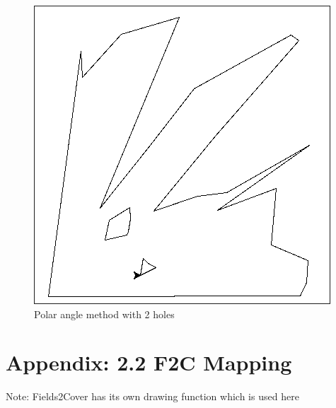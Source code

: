 \documentclass[progress]{cmpreport}
\begin{document}
\begin{appendix}
\begin{figure}[H]
		\begin{minipage}[b]{0.45\textwidth}
			\centering
			\includegraphics[width=\textwidth]{images/FirstMappingLargeHoles.jpg}
			\caption{Polar angle method with 2 holes}
		\end{minipage}
		\hfill

	\end{figure}

	\section{Appendix: 2.2 F2C Mapping}
	\label{F2CMapping}
	Note: Fields2Cover has its own drawing function which is used here


\end{appendix}
\end{document}

